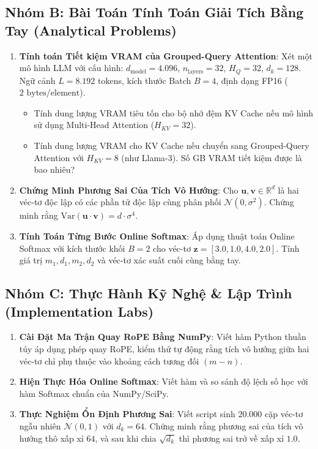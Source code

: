 \subsection{Nhóm B: Bài Toán Tính Toán Giải Tích Bằng Tay (Analytical Problems)}
\begin{enumerate}
  \item \textbf{Tính toán Tiết kiệm VRAM của Grouped-Query Attention}:
  Xét một mô hình LLM với cấu hình: $d_{\text{model}} = 4.096$, $n_{\text{layers}} = 32$, $H_Q = 32$, $d_k = 128$.
  Ngữ cảnh $L = 8.192$ tokens, kích thước Batch $B = 4$, định dạng FP16 ($2\text{ bytes/element}$).
  \begin{itemize}
    \item[a)] Tính dung lượng VRAM tiêu tốn cho bộ nhớ đệm KV Cache nếu mô hình sử dụng Multi-Head Attention ($H_{KV} = 32$).
    \item[b)] Tính dung lượng VRAM cho KV Cache nếu chuyển sang Grouped-Query Attention với $H_{KV} = 8$ (như Llama-3). Số GB VRAM tiết kiệm được là bao nhiêu?
  \end{itemize}

  \item \textbf{Chứng Minh Phương Sai Của Tích Vô Hướng}:
  Cho $\mathbf{u}, \mathbf{v} \in \mathbb{R}^d$ là hai véc-tơ độc lập có các phần tử độc lập cùng phân phối $\mathcal{N}(0, \sigma^2)$. Chứng minh rằng $\text{Var}(\mathbf{u} \cdot \mathbf{v}) = d \cdot \sigma^4$.

  \item \textbf{Tính Toán Từng Bước Online Softmax}:
  Áp dụng thuật toán Online Softmax với kích thước khối $B = 2$ cho véc-tơ $\mathbf{z} = [3.0, 1.0, 4.0, 2.0]$. Tính giá trị $m_1, d_1, m_2, d_2$ và véc-tơ xác suất cuối cùng bằng tay.
\end{enumerate}

\subsection{Nhóm C: Thực Hành Kỹ Nghệ \& Lập Trình (Implementation Labs)}
\begin{enumerate}
  \item \textbf{Cài Đặt Ma Trận Quay RoPE Bằng NumPy}: Viết hàm Python thuần túy áp dụng phép quay RoPE, kiểm thử tự động rằng tích vô hướng giữa hai véc-tơ chỉ phụ thuộc vào khoảng cách tương đối $(m - n)$.
  \item \textbf{Hiện Thực Hóa Online Softmax}: Viết hàm  và so sánh độ lệch số học với hàm Softmax chuẩn của NumPy/SciPy.
  \item \textbf{Thực Nghiệm Ổn Định Phương Sai}: Viết script sinh $20.000$ cặp véc-tơ ngẫu nhiên $\mathcal{N}(0, 1)$ với $d_k = 64$. Chứng minh rằng phương sai của tích vô hướng thô xấp xỉ $64$, và sau khi chia $\sqrt{d_k}$ thì phương sai trở về xấp xỉ $1.0$.
\end{enumerate}

